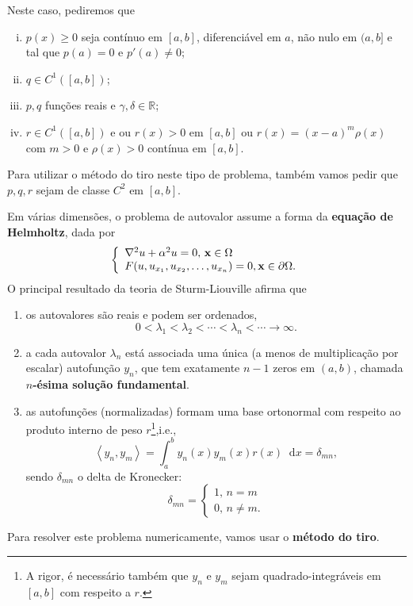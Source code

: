 \documentclass[twocolumn,showpacs,%
  nofootinbib,aps,superscriptaddress,%
  eqsecnum,prd,notitlepage,showkeys,10pt]{revtex4-1}
\newcommand{\R}{\mathbb{R}}
\newcommand*\diff{\mathop{}\!\mathrm{d}}
\renewcommand{\geq}{\geqslant}
\begin{document}
%
Neste caso, pediremos que
%
\begin{enumerate}[(i)]
    \item $p(x) \geq 0$ seja contínuo em $[a,b]$, diferenciável em $a$, não nulo em $(a,b]$
    e tal que $p(a) = 0$ e $p'(a) \neq 0$;
    \item $q\in C^1([a,b])$;
    \item $p,q$ funções reais e $\gamma, \delta\in\R$;
    \item $r\in C^1([a,b])$ e ou $r(x) > 0$ em $[a,b]$ ou $r(x) = (x-a)^m\rho(x)$
    com $m>0$ e $\rho(x) > 0$ contínua em $[a,b]$.
\end{enumerate}
%
Para utilizar o método do tiro neste tipo de problema,
também vamos pedir que $p,q,r$ sejam de classe $C^2$
em $[a,b]$.

Em várias dimensões, o problema de autovalor assume a forma da
\textbf{equação de Helmholtz}, dada por
%
\begin{equation}
\label{eq:helmholtz}
    \left\{
    \begin{array}{l}
        \laplacian u + \alpha^2u = 0, \, \mathbf{x}\in\Omega \\ 
        F(u, u_{x_1}, u_{x_2}, \dots, u_{x_n}) = 0, \mathbf{x}\in\partial\Omega.
    \end{array}
    \right.
\end{equation}
%
O principal resultado da teoria de Sturm-Liouville afirma que
%
\begin{enumerate}
    \item os autovalores são reais e podem ser ordenados,
    \[
        0 < \lambda_1 < \lambda_2 < \cdots < \lambda_n < \cdots \to \infty.
    \]
    \item a cada autovalor $\lambda_n$ está associada uma única (a menos
    de multiplicação por escalar) autofunção $y_n$, que tem exatamente 
    $n-1$ zeros em $(a,b)$, chamada \textbf{$n$-ésima solução fundamental}.

    \item as autofunções (normalizadas) formam uma base ortonormal com
    respeito ao produto interno de peso $r$\footnote{A rigor, é necessário também que
    $y_n$ e $y_m$ sejam quadrado-integráveis em $[a,b]$ com respeito a $r$.},i.e.,
    \[
        \left\langle y_n, y_m \right\rangle
        = \int_a^b y_n(x)y_m(x)r(x) \diff x
        = \delta_{mn},
    \]
    sendo $\delta_{mn}$ o delta de Kronecker:
    \[
        \delta_{mn} = \left\{
        \begin{array}{l}
            1, \, n = m \\
            0, \, n\neq m.
        \end{array}
        \right.
    \]
\end{enumerate}
%
Para resolver este problema numericamente, vamos usar o
\textbf{método do tiro}.
%
\end{document}
